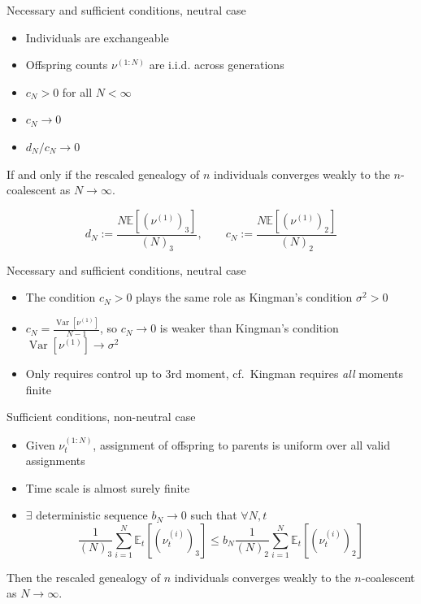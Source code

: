 \documentclass[aspectratio=169]{beamer}
\theoremstyle{definition}
\newcommand{\E}{\mathbb{E}}
\newcommand{\V}{\operatorname{Var}}
\begin{document}
\begin{frame}{Necessary and sufficient conditions, neutral case}
\begin{theorem}
\begin{itemize}
\item Individuals are exchangeable
\item Offspring counts $\nu^{(1:N)}$ are i.i.d. across generations
\item $c_N >0$ for all $N<\infty$
\item $c_N \longrightarrow 0$
\item $d_N/c_N \longrightarrow 0$
\end{itemize}
If and only if the rescaled genealogy of $n$ individuals converges weakly to the $n$-coalescent as $N\to\infty$.
\end{theorem}
\begin{equation*}
d_N := \frac{N \E[ ( \nu^{(1)} )_3 ] }{(N)_3}  ,\qquad
c_N := \frac{N \E[ ( \nu^{(1)} )_2 ] }{(N)_2} 
\end{equation*}
\end{frame}


\begin{frame}{Necessary and sufficient conditions, neutral case}
\begin{itemize}
\item The condition $c_N >0$ plays the same role as Kingman's condition $\sigma^2 >0$
\item $c_N = \frac{\V[\nu^{(1)}]}{N-1}$, so $c_N \to 0$ is weaker than Kingman's condition $\V[ \nu^{(1)} ] \to \sigma^2$
\item Only requires control up to 3rd moment, cf.\ Kingman requires \emph{all} moments finite
\end{itemize}
\end{frame}


\begin{frame}{Sufficient conditions, non-neutral case}
\begin{theorem}
\begin{itemize}
\item Given $\nu_t^{(1:N)}$, assignment of offspring to parents is uniform over all valid assignments
\item Time scale is almost surely finite
\item $\exists$ deterministic sequence $b_N \to 0$ such that $\forall N, t$
\begin{equation*}
\frac{1}{(N)_3} \sum_{i=1}^N \E_t[ (\nu_t^{(i)})_3 ]
\leq b_N \frac{1}{(N)_2} \sum_{i=1}^N \E_t[ (\nu_t^{(i)})_2 ]
\end{equation*}
\end{itemize}
Then the rescaled genealogy of $n$ individuals converges weakly to the $n$-coalescent as $N\to\infty$.
\end{theorem}
\end{frame}
\end{document}
